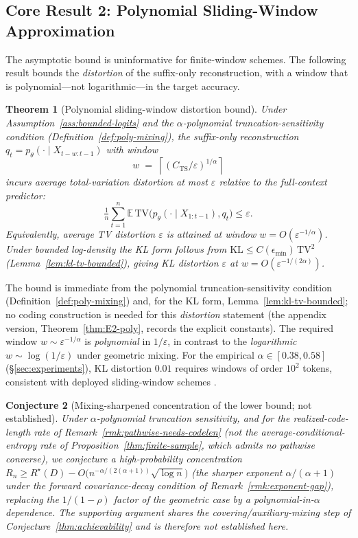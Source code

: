 \documentclass[11pt]{article}
\newcommand{\E}{\mathbb{E}}
\newcommand{\KLs}{\mathrm{KL}}
\newcommand{\TV}{\mathrm{TV}}
\theoremstyle{plain}
\newtheorem{theorem}{Theorem}[section]
\newtheorem{conjecture}[theorem]{Conjecture}
\theoremstyle{definition}
\theoremstyle{remark}
\begin{document}
\subsection{Core Result 2: Polynomial Sliding-Window Approximation}

The asymptotic bound is uninformative for finite-window schemes. The
following result bounds the \emph{distortion} of the suffix-only
reconstruction, with a window that is polynomial---not
logarithmic---in the target accuracy.

\begin{theorem}[Polynomial sliding-window distortion bound]\label{thm:E2}
Under Assumption~\ref{ass:bounded-logits} and the
$\alpha$-polynomial truncation-sensitivity condition
(Definition~\ref{def:poly-mixing}), the suffix-only reconstruction
$q_t = p_\theta(\cdot \mid X_{t-w:t-1})$ with window
\[
w \;=\; \left\lceil (C_{\mathrm{TS}}/\varepsilon)^{1/\alpha} \right\rceil
\]
incurs average total-variation distortion at most $\varepsilon$
relative to the full-context predictor:
\[
\tfrac1n\sum_{t=1}^n \E\,\TV\bigl(p_\theta(\cdot\mid X_{1:t-1}), q_t\bigr) \le \varepsilon.
\]
Equivalently, average TV distortion $\varepsilon$ is attained at
window $w = O(\varepsilon^{-1/\alpha})$. Under bounded log-density the
KL form follows from $\KLs \le C(\epsilon_{\min})\,\TV^2$
(Lemma~\ref{lem:kl-tv-bounded}), giving KL distortion $\varepsilon$ at
$w = O(\varepsilon^{-1/(2\alpha)})$.
\end{theorem}

The bound is immediate from the polynomial truncation-sensitivity
condition (Definition~\ref{def:poly-mixing}) and, for the KL form,
Lemma~\ref{lem:kl-tv-bounded}; no coding construction is needed for
this \emph{distortion} statement (the appendix version,
Theorem~\ref{thm:E2-poly}, records the explicit constants). The
required window $w \sim \varepsilon^{-1/\alpha}$ is \emph{polynomial}
in $1/\varepsilon$, in contrast to the \emph{logarithmic}
$w \sim \log(1/\varepsilon)$ under geometric mixing. For the empirical
$\alpha \in [0.38, 0.58]$ (\S\ref{sec:experiments}), KL distortion
$0.01$ requires windows of order $10^2$ tokens, consistent with
deployed sliding-window schemes
\citep{xiao2024efficient,jiang2023mistral7b}.

\begin{conjecture}[Mixing-sharpened concentration of the lower bound; not established]
\label{cor:mixing-conc}
Under $\alpha$-polynomial truncation sensitivity, and \emph{for the
realized-code-length rate} of Remark~\ref{rmk:pathwise-needs-codelen}
(not the average-conditional-entropy rate of
Proposition~\ref{thm:finite-sample}, which admits no pathwise
converse), we conjecture a high-probability concentration
$R_n \geq R^\star(D) - O\bigl(n^{-\alpha/(2(\alpha+1))} \sqrt{\log n}\bigr)$ (the sharper exponent $\alpha/(\alpha+1)$ under the
forward covariance-decay condition of
Remark~\ref{rmk:exponent-gap}), replacing the $1/(1-\rho)$ factor of
the geometric case by a polynomial-in-$\alpha$ dependence. The
supporting argument shares the covering/auxiliary-mixing step of
Conjecture~\ref{thm:achievability} and is therefore not established
here.
\end{conjecture}
\end{document}

